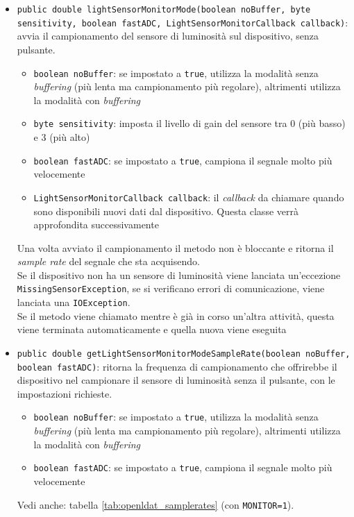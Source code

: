 \begin{itemize}
	\item \texttt{public double lightSensorMonitorMode(boolean noBuffer, byte sensitivity, boolean fastADC, LightSensorMonitorCallback callback)}: avvia il campionamento del sensore di luminosità sul dispositivo, senza pulsante.\begin{itemize}
		\item \texttt{boolean noBuffer}: se impostato a \texttt{true}, utilizza la modalità senza \textit{buffering} (più lenta ma campionamento più regolare), altrimenti utilizza la modalità con \textit{buffering}
		\item \texttt{byte sensitivity}: imposta il livello di gain del sensore tra 0 (più basso) e 3 (più alto)
		\item \texttt{boolean fastADC}: se impostato a \texttt{true}, campiona il segnale molto più velocemente
		\item \texttt{LightSensorMonitorCallback callback}: il \textit{callback} da chiamare quando sono disponibili nuovi dati dal dispositivo. Questa classe verrà approfondita successivamente
	\end{itemize}
	Una volta avviato il campionamento il metodo non è bloccante e ritorna il \textit{sample rate} del segnale che sta acquisendo.\\
	Se il dispositivo non ha un sensore di luminosità viene lanciata un'eccezione \texttt{MissingSensorException}, se si verificano errori di comunicazione, viene lanciata una \texttt{IOException}.\\
	Se il metodo viene chiamato mentre è già in corso un'altra attività, questa viene terminata automaticamente e quella nuova viene eseguita
	\item \texttt{public double getLightSensorMonitorModeSampleRate(boolean noBuffer, boolean fastADC)}: ritorna la frequenza di campionamento che offrirebbe il dispositivo nel campionare il sensore di luminosità senza il pulsante, con le impostazioni richieste.\begin{itemize}
		\item \texttt{boolean noBuffer}: se impostato a \texttt{true}, utilizza la modalità senza \textit{buffering} (più lenta ma campionamento più regolare), altrimenti utilizza la modalità con \textit{buffering}
		\item \texttt{boolean fastADC}: se impostato a \texttt{true}, campiona il segnale molto più velocemente
	\end{itemize}
	Vedi anche: tabella \ref{tab:openldat_samplerates} (con \texttt{MONITOR=1}).\\

\end{itemize}
